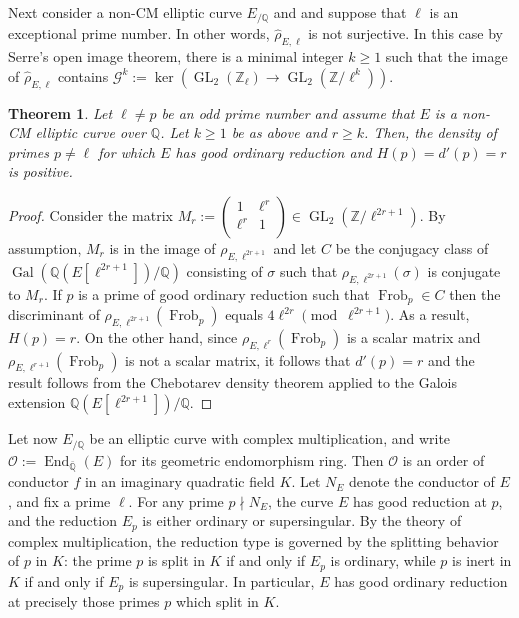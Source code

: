 \documentclass[table]{amsart}
\newtheorem{theorem}{Theorem}[section]
\newcommand{\Z}{\mathbb{Z}}
\newcommand{\Q}{\mathbb{Q}}
\newcommand{\cO}{\mathcal{O}}
\newcommand{\op}[1]{\operatorname{#1}}
\newcommand\mtx[4] { \left( {\begin{array}{cc}
 #1 & #2 \\
 #3 & #4 \\
 \end{array} } \right)}
\numberwithin{equation}{section}
\begin{document}
\par Next consider a non-CM elliptic curve $E_{/\Q}$ and and suppose that $\ell$ is an exceptional prime number. In other words, $\widehat{\rho}_{E, \ell}$ is not surjective. In this case by Serre's open image theorem, there is a minimal integer $k\geq 1$ such that the image of $\widehat{\rho}_{E,\ell}$ contains $\mathcal{G}^k:=\op{ker}\left(\op{GL}_2(\Z_\ell)\longrightarrow \op{GL}_2(\Z/\ell^k)\right)$. 
\begin{theorem}\label{section 3 thm 3}
    Let $\ell\neq p$ be an odd prime number and assume that $E$ is a non-CM elliptic curve over $\Q$. Let $k\geq 1$ be as above and $r\geq k$. Then, the density of primes $p\neq \ell$ for which $E$ has good ordinary reduction and $H(p)=d'(p)=r$ is positive. 
\end{theorem}
\begin{proof}
    Consider the matrix $M_r:=\mtx{1}{\ell^r}{\ell^r}{1}\in \op{GL}_2(\Z/\ell^{2r+1})$. By assumption, $M_r$ is in the image of $\rho_{E, \ell^{2r+1}}$ and let $C$ be the conjugacy class of $\op{Gal}(\Q(E[\ell^{2r+1}])/\Q)$ consisting of $\sigma$ such that $\rho_{E, \ell^{2r+1}}(\sigma)$ is conjugate to $M_r$. If $p$ is a prime of good ordinary reduction such that $\op{Frob}_p\in C$ then the discriminant of $\rho_{E, \ell^{2r+1}}(\op{Frob}_p)$ equals $4\ell^{2r}\pmod{\ell^{2r+1}}$. As a result, $H(p)=r$. On the other hand, since $\rho_{E, \ell^{r}}(\op{Frob}_p)$ is a scalar matrix and $\rho_{E, \ell^{r+1}}(\op{Frob}_p)$ is not a scalar matrix, it follows that $d'(p)=r$ and the result follows from the Chebotarev density theorem applied to the Galois extension $\Q(E[\ell^{2r+1}])/\Q$.
\end{proof}

Let now $E_{/\Q}$ be an elliptic curve with complex multiplication, and write $\cO := \op{End}_{\bar{\Q}}(E)$
for its geometric endomorphism ring. Then $\cO$ is an order of conductor $f$ in an imaginary quadratic field $K$. Let $N_E$ denote the conductor of $E$, and fix a prime $\ell$. For any prime $p\nmid N_E$, the curve $E$ has good reduction at $p$, and the reduction $E_p$ is either ordinary or supersingular. By the theory of complex multiplication, the reduction type is governed by the splitting behavior of $p$ in $K$: the prime $p$ is split in $K$ if and only if $E_p$ is ordinary, while $p$ is inert in $K$ if and only if $E_p$ is supersingular. In particular, $E$ has good ordinary reduction at precisely those primes $p$ which split in $K$.
\end{document}

